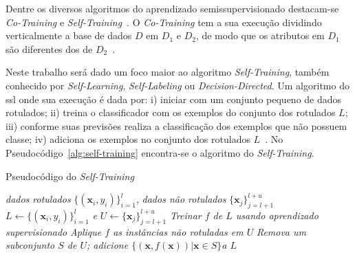     Dentre os diversos algoritmos do aprendizado semissupervisionado destacam\hyp{se} \textit{Co\hyp{Training}} e \textit{Self\hyp{Training}}~\cite{zhu2008survey}. O \textit{Co\hyp{Training}} tem a sua execução dividindo verticalmente a base de dados $D$ em $D_1$ e $D_2$, de modo que os atributos em $D_1$ são diferentes dos de $D_2$~\cite{blum1998cotraining}.
    
    
    Neste trabalho será dado um foco maior ao algoritmo \textit{Self\hyp{Training}}, também conhecido por \textit{Self\hyp{Learning}}, \textit{Self\hyp{Labeling}} ou \textit{Decision\hyp{Directed}}. Um algoritmo do \ac{ssl} onde sua execução é dada por: i) iniciar com um conjunto pequeno de dados rotulados; ii) treina o classificador com os exemplos do conjunto dos rotulados $L$; iii) conforme suas previsões realiza a classificação dos exemplos que não possuem classe; iv) adiciona os exemplos no conjunto dos rotulados $L$~\cite{chapelle2006semi, grandvalet2005semi, zhu2009introduction}. No Pseudocódigo~\ref{alg:self-training} encontra-se o algoritmo do \textit{Self\hyp{Training}}.
	
    \begin{algorithm}[H]
        \caption{Pseudocódigo do \textit{Self\hyp{Training}}}
        \label{alg:self-training}
        \SetAlgoLined
        \begin{algorithmic}[1]
            \REQUIRE \textit{dados rotulados} $\{(\mathbf{x}_i, y_i)\}^l_{i = 1}$, \textit{dados não rotulados} $\{\mathbf{x}_j\}^{l+u}_{j=l+1}$
            \ENSURE $L \leftarrow \{(\mathbf{x}_i, y_i)\}^l_{i = 1}$ \textit{e} $U \leftarrow \{\mathbf{x}_j\}^{l+u}_{j = l+1}$
            \REPEAT
            	\STATE \textit{Treinar $f$ de $L$ usando aprendizado supervisionado}
            	\STATE \textit{Aplique $f$ as instâncias não rotuladas em $U$}
            	\STATE \textit{Remova um subconjunto $S$ de $U$; adicione $\{(\mathbf{x}, f(\mathbf{x}))|\mathbf{x}\in S\}$a $L$}
        \end{algorithmic}
    \end{algorithm}
	\begin{center}
        \vspace{-2em}
	\end{center}
	
